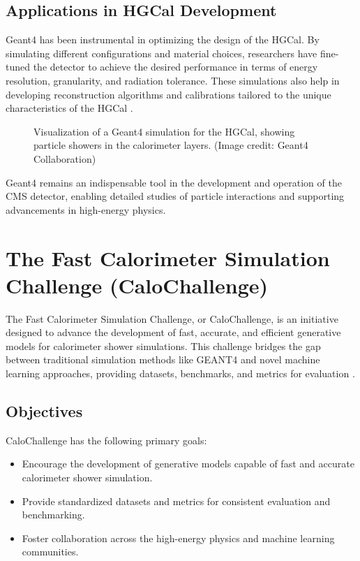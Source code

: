\subsection{Applications in HGCal Development}

Geant4 has been instrumental in optimizing the design of the HGCal. By simulating different configurations and material choices, researchers have fine-tuned the detector to achieve the desired performance in terms of energy resolution, granularity, and radiation tolerance. These simulations also help in developing reconstruction algorithms and calibrations tailored to the unique characteristics of the HGCal \cite{geant4_toolkit}.

\begin{figure}[h]
    \centering
    \caption{Visualization of a Geant4 simulation for the HGCal, showing particle showers in the calorimeter layers. (Image credit: Geant4 Collaboration)}
    \label{fig:geant4_simulation}
\end{figure}

Geant4 remains an indispensable tool in the development and operation of the CMS detector, enabling detailed studies of particle interactions and supporting advancements in high-energy physics.

\section{The Fast Calorimeter Simulation Challenge (CaloChallenge)}

The Fast Calorimeter Simulation Challenge, or CaloChallenge, is an initiative designed to advance the development of fast, accurate, and efficient generative models for calorimeter shower simulations. This challenge bridges the gap between traditional simulation methods like GEANT4 and novel machine learning approaches, providing datasets, benchmarks, and metrics for evaluation \cite{calochallenge}.

\subsection{Objectives}

CaloChallenge has the following primary goals:

\begin{itemize}
    \item Encourage the development of generative models capable of fast and accurate calorimeter shower simulation.
    \item Provide standardized datasets and metrics for consistent evaluation and benchmarking.
    \item Foster collaboration across the high-energy physics and machine learning communities.
\end{itemize}

